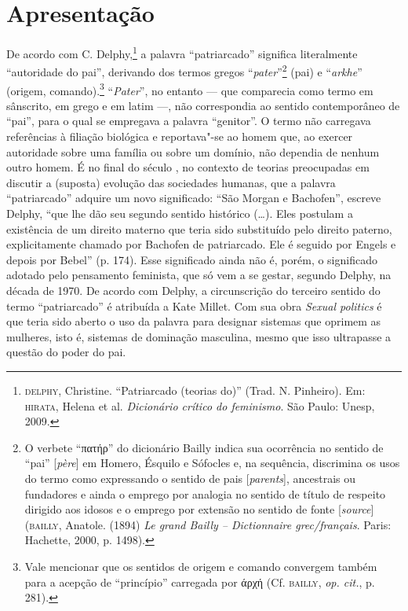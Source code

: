 \chapter{Apresentação}

De acordo com C. Delphy,\footnote{\textsc{delphy}, Christine. ``Patriarcado
  (teorias do)'' (Trad. N. Pinheiro). Em: \textsc{hirata}, Helena et al.
  \emph{Dicionário crítico do feminismo}. São Paulo: Unesp, 2009.} a
palavra ``patriarcado'' significa literalmente ``autoridade do pai'',
derivando dos termos gregos ``\emph{pater}''\footnote{O verbete
  ``πατήρ'' do dicionário Bailly indica sua ocorrência no sentido de
  ``pai'' {[}\emph{père}{]} em Homero, Ésquilo e Sófocles e, na
  sequência, discrimina os usos do termo como expressando o sentido de
  pais {[}\emph{parents}{]}, ancestrais ou fundadores e ainda o emprego
  por analogia no sentido de título de respeito dirigido aos idosos e o
  emprego por extensão no sentido de fonte {[}\emph{source}{]} (\textsc{bailly},
  Anatole. (1894) \emph{Le grand Bailly -- Dictionnaire grec/français}.
  Paris: Hachette, 2000, p. 1498).} (pai) e ``\emph{arkhe}'' (origem,
comando).\footnote{Vale mencionar que os sentidos de origem e comando
  convergem também para a acepção de ``princípio'' carregada por άρχή
  (Cf. \textsc{bailly}, \emph{op. cit.}, p. 281).} ``\emph{Pater}'', no entanto
--- que comparecia como termo em sânscrito, em grego e em latim ---, não
correspondia ao sentido contemporâneo de ``pai'', para o qual se
empregava a palavra ``genitor''. O termo não carregava referências à filiação biológica e reportava"-se ao homem que, ao exercer autoridade sobre uma família ou sobre um domínio, não dependia de nenhum outro homem. É no final do século , no contexto de teorias preocupadas em
discutir a (suposta) evolução das sociedades humanas, que a palavra
``patriarcado'' adquire um novo significado: ``São Morgan e Bachofen'',
escreve Delphy, ``que lhe dão seu segundo sentido histórico (\ldots{}). Eles
postulam a existência de um direito materno que teria sido substituído
pelo direito paterno, explicitamente chamado por Bachofen de
patriarcado. Ele é seguido por Engels e depois por Bebel'' (p. 174).
Esse significado ainda não é, porém, o significado adotado pelo
pensamento feminista, que só vem a se gestar, segundo Delphy, na década
de 1970. De acordo com Delphy, a circunscrição do terceiro sentido
do termo ``patriarcado'' é atribuída a Kate Millet. Com sua obra
\emph{Sexual politics} é que teria sido aberto o uso da palavra para
designar sistemas que oprimem as mulheres, isto é, sistemas de dominação
masculina, mesmo que isso ultrapasse a questão do poder do pai.

